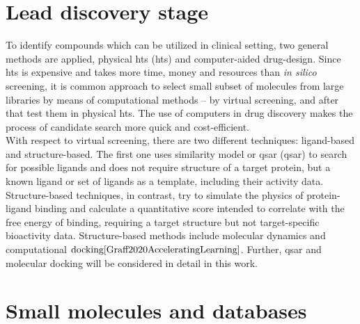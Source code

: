 \section{Lead discovery stage}\label{lead_disc}

To identify compounds which can be utilized in clinical setting, two general methods 
are applied, physical \acrlong{hts} (\acrshort{hts}) and computer-aided drug-design. %
Since \acrshort{hts} is expensive and takes more time, money and resources than 
\textit{in silico }screening, it is common approach to select small subset of molecules 
from large libraries by means of computational methods -- by virtual screening, and 
after that test them in physical \acrshort{hts}.
The use of computers in drug discovery makes the process of candidate search more 
quick and cost-efficient.\\ %

With respect to virtual screening, there are two different techniques: ligand-based 
and structure-based. %
The first one uses similarity model or \acrlong{qsar} (\acrshort{qsar}) to search 
for possible ligands and does not require structure of a target protein, but a known ligand or set of ligands
as a template, including their activity data.
Structure-based techniques, in contrast, try to simulate the physics of protein-ligand 
binding and calculate a quantitative score intended to correlate with the free energy 
of binding, requiring a target structure but not target-specific bioactivity data.
Structure-based methods include molecular dynamics and computational $\text{docking}{\cite{Graff2020AcceleratingLearning}}$. 
Further, \acrshort{qsar} and molecular docking will be considered in detail in this 
work.\\



\section{Small molecules and databases}

